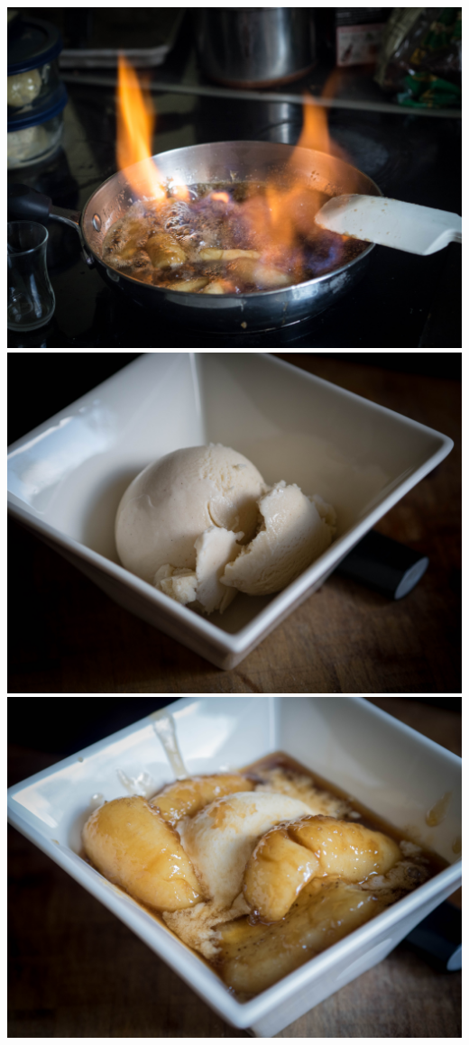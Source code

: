 \newpage
\includegraphics[width=\textwidth]{food/bananas-foster/images/hi-res/08.jpg}
\newpage
\includegraphics[width=\textwidth]{food/bananas-foster/images/hi-res/09.jpg}
\newpage
\includegraphics[width=\textwidth]{food/bananas-foster/images/hi-res/10.jpg}

